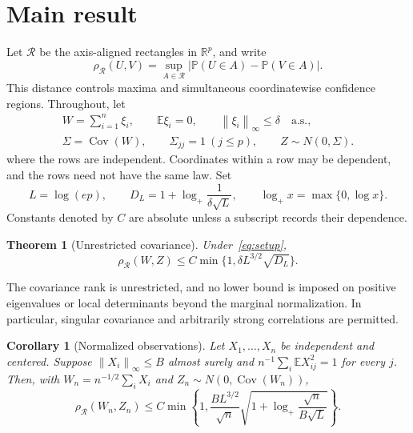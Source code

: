 \documentclass[11pt,letterpaper]{article}
\newtheorem{theorem}{Theorem}
\newtheorem{corollary}{Corollary}
\theoremstyle{remark}
\newcommand{\E}{\mathbb E}
\newcommand{\Pp}{\mathbb P}
\newcommand{\R}{\mathbb R}
\newcommand{\Cov}{\operatorname{Cov}}
\newcommand{\norm}[1]{\left\lVert#1\right\rVert}
\newcommand{\rh}{\rho_{\mathcal R}}
\begin{document}
\section{Main result}\label{sec:results}
Let \(\mathcal R\) be the axis-aligned rectangles in \(\R^p\), and write
\[
 \rh(U,V)=\sup_{A\in\mathcal R}
       |\Pp(U\in A)-\Pp(V\in A)|.
\]
This distance controls maxima and simultaneous coordinatewise confidence
regions. Throughout, let
\begin{equation}
 \begin{gathered}
 W=\sum_{i=1}^n\xi_i,\qquad
 \E\xi_i=0,\qquad \norm{\xi_i}_\infty\le\delta\quad\text{a.s.},\\
 \Sigma=\Cov(W),\qquad\Sigma_{jj}=1\ (j\le p),
 \qquad Z\sim N(0,\Sigma).
 \end{gathered}
 \label{eq:setup}
\end{equation}
where the rows are independent. Coordinates within a row may be
dependent, and the rows need not have the same law. Set
\[
 L=\log(ep),\qquad
 D_L=1+\log_+\frac1{\delta\sqrt L},\qquad
 \log_+x=\max\{0,\log x\}.
\]
Constants denoted by \(C\) are absolute unless a subscript records
their dependence.

\begin{theorem}[Unrestricted covariance]\label{thm:unrestricted}
Under~\eqref{eq:setup},
\begin{equation}
 \rh(W,Z)\le C\min\{1,\delta L^{3/2}\sqrt{D_L}\}.
 \label{eq:unrestricted}
\end{equation}
\end{theorem}

The covariance rank is unrestricted, and no lower bound is imposed on
positive eigenvalues or local determinants beyond the marginal
normalization. In particular, singular covariance and arbitrarily strong
correlations are permitted.

\begin{corollary}[Normalized observations]\label{cor:observations}
Let \(X_1,\ldots,X_n\) be independent and centered. Suppose
\(\norm{X_i}_\infty\le B\) almost surely and
\(n^{-1}\sum_i\E X_{ij}^2=1\) for every \(j\). Then, with
\(W_n=n^{-1/2}\sum_iX_i\) and \(Z_n\sim N(0,\Cov(W_n))\),
\begin{equation}
 \rh(W_n,Z_n)\le C\min\!\left\{1,
 \frac{B L^{3/2}}{\sqrt n}
 \sqrt{1+\log_+\frac{\sqrt n}{B\sqrt L}}\right\}.
 \label{eq:observations-unrestricted}
\end{equation}
\end{corollary}
\end{document}
